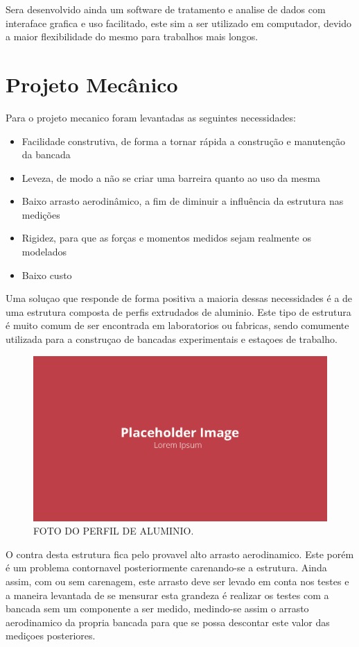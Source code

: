 Sera desenvolvido ainda um software de tratamento e analise de dados com interaface grafica e uso facilitado, este sim a ser utilizado em computador, devido a maior flexibilidade do mesmo para trabalhos mais longos.

\section{Projeto Mecânico}

Para o projeto mecanico foram levantadas as seguintes necessidades:

\begin{itemize}
    \item Facilidade construtiva, de forma a tornar rápida a construção e manutenção da bancada
    \item Leveza, de modo a não se criar uma barreira quanto ao uso da mesma
    \item Baixo arrasto aerodinâmico, a fim de diminuir a influência da estrutura nas medições
    \item Rigidez, para que as forças e momentos medidos sejam realmente os modelados
    \item Baixo custo
\end{itemize}

Uma soluçao que responde de forma positiva a maioria dessas necessidades é a de uma estrutura composta de perfis extrudados de aluminio. Este tipo de estrutura é muito comum de ser encontrada em laboratorios ou fabricas, sendo comumente utilizada para a construçao de bancadas experimentais e estaçoes de trabalho.

\begin{figure}[!ht]
    \centering
    \includegraphics[width=.8\linewidth]{figuras/placeholder.png}
    \caption{FOTO DO PERFIL DE ALUMINIO\cite{autor}.}
    \label{fig:placeholder}
\end{figure}

O contra desta estrutura fica pelo provavel alto arrasto aerodinamico. Este porém é um problema contornavel posteriormente carenando-se a estrutura. Ainda assim, com ou sem carenagem, este arrasto deve ser levado em conta nos testes e a maneira levantada de se mensurar esta grandeza é realizar os testes com a bancada sem um componente a ser medido, medindo-se assim o arrasto aerodinamico da propria bancada para que se possa descontar este valor das mediçoes posteriores.

